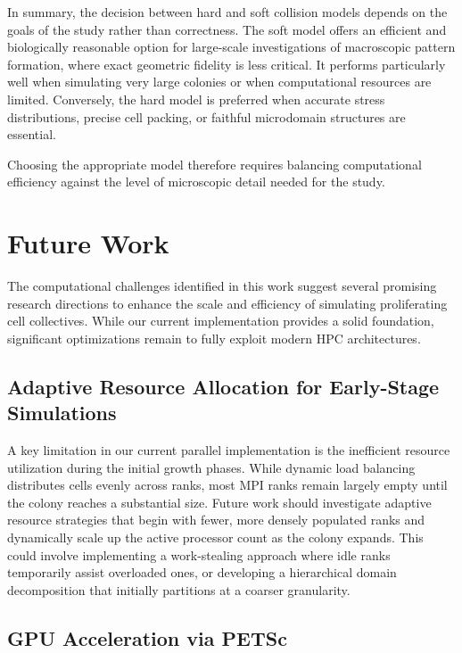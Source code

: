 \documentclass[conference]{IEEEtran}
\begin{document}
In summary, the decision between hard and soft collision models depends on the goals of the study rather than correctness. The soft model offers an efficient and biologically reasonable option for large-scale investigations of macroscopic pattern formation, where exact geometric fidelity is less critical. It performs particularly well when simulating very large colonies or when computational resources are limited. Conversely, the hard model is preferred when accurate stress distributions, precise cell packing, or faithful microdomain structures are essential.

Choosing the appropriate model therefore requires balancing computational efficiency against the level of microscopic detail needed for the study.

\section{Future Work}

The computational challenges identified in this work suggest several promising research directions to enhance the scale and efficiency of simulating proliferating cell collectives. While our current implementation provides a solid foundation, significant optimizations remain to fully exploit modern HPC architectures.

\subsection{Adaptive Resource Allocation for Early-Stage Simulations}

A key limitation in our current parallel implementation is the inefficient resource utilization during the initial growth phases. While dynamic load balancing distributes cells evenly across ranks, most MPI ranks remain largely empty until the colony reaches a substantial size. Future work should investigate adaptive resource strategies that begin with fewer, more densely populated ranks and dynamically scale up the active processor count as the colony expands. This could involve implementing a work-stealing approach where idle ranks temporarily assist overloaded ones, or developing a hierarchical domain decomposition that initially partitions at a coarser granularity.

\subsection{GPU Acceleration via PETSc}
\end{document}
